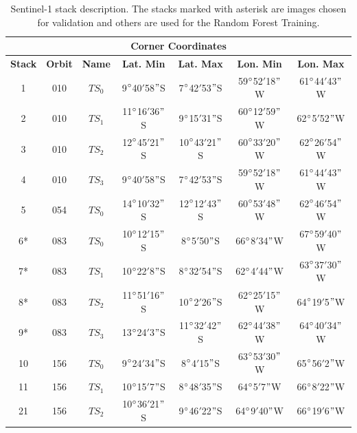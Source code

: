 \begin{table}[h]
    \centering
    \begin{tabular}{|c|c|c||c|c|c|c|}
        \hline 
        \multicolumn{7}{|c|}{Corner Coordinates} \\ 
        \hline
        \textbf{Stack} & \textbf{Orbit} &\textbf{Name} &\textbf{Lat. Min} &\textbf{Lat. Max} &\textbf{Lon. Min} &\textbf{Lon. Max} \\
        \hline
        1&010&$TS_0$ &9$\degree$40$'$58$"$S &7$\degree$42$'$53$"$S &59$\degree$52$'$18$"$W &61$\degree$44$'$43$"$W \\
        2&010&$TS_1$ &11$\degree$16$'$36$"$S &9$\degree$15$'$31$"$S &60$\degree$12$'$59$"$W &62$\degree$5$'$52$"$W \\
        3&010&$TS_2$ &12$\degree$45$'$21$"$S &10$\degree$43$'$21$"$S &60$\degree$33$'$20$"$W &62$\degree$26$'$54$"$W \\
        4&010&$TS_3$ &9$\degree$40$'$58$"$S &7$\degree$42$'$53$"$S &59$\degree$52$'$18$"$W &61$\degree$44$'$43$"$W \\
        5&054&$TS_0$ &14$\degree$10$'$32$"$S &12$\degree$12$'$43$"$S &60$\degree$53$'$48$"$W &62$\degree$46$'$54$"$W \\
        6*&083&$TS_0$&10$\degree$12$'$15$"$S &8$\degree$5$'$50$"$S &66$\degree$8$'$34$"$W &67$\degree$59$'$40$"$W \\
        7*&083&$TS_1$&10$\degree$22$'$8$"$S &8$\degree$32$'$54$"$S &62$\degree$4$'$44$"$W &63$\degree$37$'$30$"$W \\
        8*&083&$TS_2$&11$\degree$51$'$16$"$S &10$\degree$2$'$26$"$S &62$\degree$25$'$15$"$W &64$\degree$19$'$5$"$W \\
        9*&083&$TS_3$&13$\degree$24$'$3$"$S &11$\degree$32$'$42$"$S &62$\degree$44$'$38$"$W &64$\degree$40$'$34$"$W \\
        10&156&$TS_0$&9$\degree$24$'$34$"$S &8$\degree$4$'$15$"$S &63$\degree$53$'$30$"$W &65$\degree$56$'$2$"$W \\
        11&156&$TS_1$&10$\degree$15$'$7$"$S &8$\degree$48$'$35$"$S &64$\degree$5$'$7$"$W &66$\degree$8$'$22$"$W \\
        21&156&$TS_2$&10$\degree$36$'$21$"$S &9$\degree$46$'$22$"$S &64$\degree$9$'$40$"$W &66$\degree$19$'$6$"$W \\
        \hline
    \end{tabular}
    \caption{Sentinel-1 stack description. The stacks marked with asterisk are images chosen for validation and others are used for the Random Forest Training.}
    \label{tab:sentinelStackTable}
\end{table}

